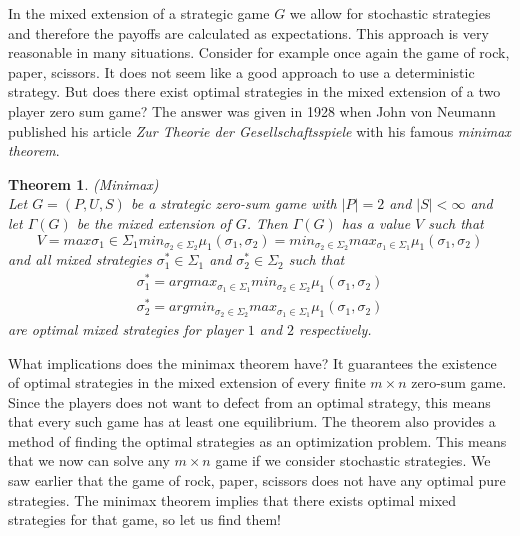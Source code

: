 \documentclass{article}
\newtheorem{theorem}{Theorem}[section]
\theoremstyle{definition}
\theoremstyle{remark}
\begin{document}
In the mixed extension of a strategic game $G$ we allow for stochastic
strategies and therefore the payoffs are calculated as
expectations. This approach is very reasonable in many
situations. Consider for example once again the game of rock, paper, scissors. It does not seem like a good approach to use a deterministic
strategy. But does there exist optimal strategies in the mixed
extension of a two player zero sum game? The answer was given in 1928
when John von Neumann published his article \emph{Zur Theorie der
  Gesellschaftsspiele} with his famous \emph{minimax theorem}.

\begin{theorem}(Minimax)\\
Let $G = (P,U,S)$ be a strategic zero-sum game with $|P| = 2$ and $|S|
< \infty$ and let $\Gamma (G)$ be the mixed extension of $G$. Then
$\Gamma (G)$ has a value $V$ such that
\begin{equation}
  V = max{\sigma _1 \in
  \Sigma_1} min_{\sigma _2 \in \Sigma_2} \mu_1(\sigma_1,\sigma_2) = min_{\sigma _2 \in
  \Sigma_2} max_{\sigma _1 \in \Sigma_1} \mu_1(\sigma_1,\sigma_2)
\end{equation}
and all mixed strategies $\sigma _1^* \in \Sigma_1$ and $\sigma _2^*
\in \Sigma_2$ such that
\begin{equation}
  \begin{gathered}
\sigma_1^* = argmax_{\sigma _1 \in
  \Sigma_1} min_{\sigma _2 \in \Sigma_2} \mu_1(\sigma_1,\sigma_2)\\
 \sigma_2^* = argmin_{\sigma _2 \in \Sigma_2} max_{\sigma _1 \in
   \Sigma_1} \mu_1(\sigma_1,\sigma_2)
\end{gathered}
\end{equation}
 are optimal mixed strategies for player $1$ and $2$ respectively.
\end{theorem}

What implications does the minimax theorem have? It guarantees the
existence of optimal strategies in the mixed extension of every finite
$m\times n$ zero-sum game. Since the players does not want to defect
from an optimal strategy, this means that every such game has at least
one equilibrium. The theorem also provides a method of finding the
optimal strategies as an optimization problem. This means that we now
can solve any $m\times n$ game if we consider stochastic strategies. We
saw earlier that the game of rock, paper, scissors does not have any
optimal pure strategies. The minimax theorem implies that there exists
optimal mixed strategies for that game, so let us find them!\\
\end{document}
